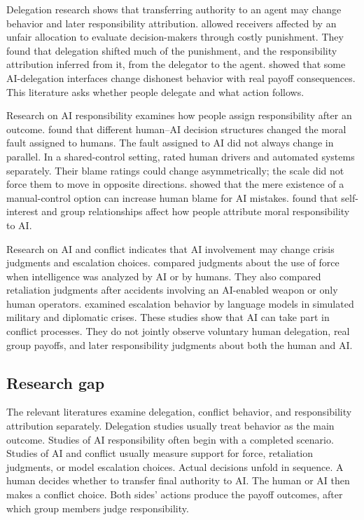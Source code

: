 \documentclass[11pt,a4paper]{article}
\begin{document}
Delegation research shows that transferring authority to an agent may change behavior and later responsibility attribution. \citet{BartlingFischbacher2012} allowed receivers affected by an unfair allocation to evaluate decision-makers through costly punishment. They found that delegation shifted much of the punishment, and the responsibility attribution inferred from it, from the delegator to the agent. \citet{KobisEtAl2025} showed that some AI-delegation interfaces change dishonest behavior with real payoff consequences. This literature asks whether people delegate and what action follows.

Research on AI responsibility examines how people assign responsibility after an outcome. \citet{ShankEtAl2019} found that different human--AI decision structures changed the moral fault assigned to humans. The fault assigned to AI did not always change in parallel. In a shared-control setting, \citet{AwadEtAl2020} rated human drivers and automated systems separately. Their blame ratings could change asymmetrically; the scale did not force them to move in opposite directions. \citet{ArnestadEtAl2024} showed that the mere existence of a manual-control option can increase human blame for AI mistakes. \citet{DongBocian2024} found that self-interest and group relationships affect how people attribute moral responsibility to AI.

Research on AI and conflict indicates that AI involvement may change crisis judgments and escalation choices. \citet{HorowitzLinGreenberg2022} compared judgments about the use of force when intelligence was analyzed by AI or by humans. They also compared retaliation judgments after accidents involving an AI-enabled weapon or only human operators. \citet{RiveraEtAl2024} examined escalation behavior by language models in simulated military and diplomatic crises. These studies show that AI can take part in conflict processes. They do not jointly observe voluntary human delegation, real group payoffs, and later responsibility judgments about both the human and AI.

\subsection{Research gap}

The relevant literatures examine delegation, conflict behavior, and responsibility attribution separately. Delegation studies usually treat behavior as the main outcome. Studies of AI responsibility often begin with a completed scenario. Studies of AI and conflict usually measure support for force, retaliation judgments, or model escalation choices. Actual decisions unfold in sequence. A human decides whether to transfer final authority to AI. The human or AI then makes a conflict choice. Both sides' actions produce the payoff outcomes, after which group members judge responsibility.
\end{document}
